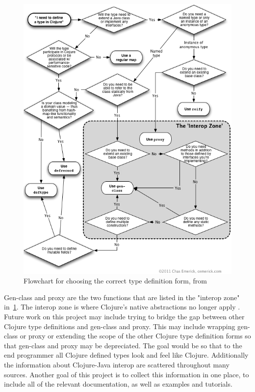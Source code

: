 \documentclass[12pt]{article}
\begin{document}
	\begin{figure}[H]
	\begin{center}
	\includegraphics[scale=.55]{images/choosingtypeforms.png}
	\caption{Flowchart for choosing the correct type definition form, from \cite{choosing-types}\label{type:flow}}
	\end{center}	
	\end{figure}
	
	Gen-class and proxy are the two functions that are listed in the "interop zone" in~\ref{type:flow}. The interop zone is where Clojure's native abstractions no longer apply \cite{choosing-types}. Future work on this project may include trying to bridge the gap between other Clojure type definitions and gen-class and proxy. This may include wrapping gen-class or proxy or extending the scope of the other Clojure type definition forms so that gen-class and proxy may be depreciated. The goal would be so that to the end programmer all Clojure defined types look and feel like Clojure. 
	Additionally the information about Clojure-Java interop are scattered throughout many sources. Another goal of this project is to collect this information in one place, to include all of the relevant documentation, as well as examples and tutorials.
	
\end{document}
